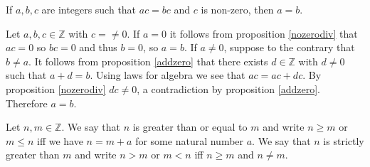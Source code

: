 \documentclass{article}
\begin{document}
\begin{corollary}
	If \(a,b,c\) are integers such that \(ac=bc\) and \(c\) is non-zero, then \(a=b\).
	\begin{IEEEproof}
		Let \(a,b,c\in\mathbb{Z}\) with \(c=\neq 0\). If \(a=0\) it follows from proposition \ref{nozerodiv} that \(ac=0\) so \(bc=0\) and thus \(b=0\), so \(a=b\). If \(a\neq 0\), suppose to the contrary that \(b\neq a\). It follows from proposition \ref{addzero} that there exists \(d\in\mathbb{Z}\) with \(d\neq 0\) such that \(a+d=b\). Using laws for algebra we see that \(ac=ac+dc\). By proposition \ref{nozerodiv} \(dc\neq 0\), a contradiction by proposition \ref{addzero}. Therefore \(a=b\).
	\end{IEEEproof}
\end{corollary}
\begin{definition}
	Let \(n,m\in\mathbb{Z}\). We say that \(n\) is greater than or equal to \(m\) and write \(n\geq m\) or \(m\leq n\) iff we have \(n=m+a\) for some natural number \(a\). We say that \(n\) is strictly greater than \(m\) and write \(n>m\) or \(m<n\) iff \(n\geq m\) and \(n\neq m\).
\end{definition}
\end{document}

